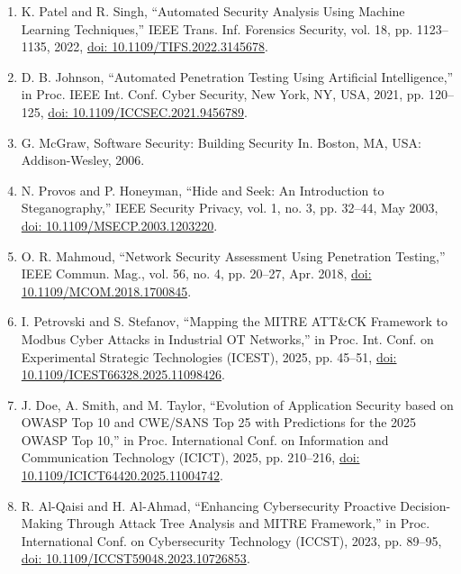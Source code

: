 \documentclass[journal]{IEEEtran}
\begin{document}
\begin{enumerate}
\item K. Patel and R. Singh, “Automated Security Analysis Using Machine Learning Techniques,” IEEE Trans. Inf. Forensics Security, vol. 18, pp. 1123–1135, 2022, \href{https://doi.org/10.1109/TIFS.2022.3145678}{doi: 10.1109/TIFS.2022.3145678}.

\item D. B. Johnson, “Automated Penetration Testing Using Artificial Intelligence,” in Proc. IEEE Int. Conf. Cyber Security, New York, NY, USA, 2021, pp. 120–125, \href{https://doi.org/10.1109/ICCSEC.2021.9456789}{doi: 10.1109/ICCSEC.2021.9456789}.

\item G. McGraw, Software Security: Building Security In. Boston, MA, USA: Addison-Wesley, 2006.

\item N. Provos and P. Honeyman, “Hide and Seek: An Introduction to Steganography,” IEEE Security Privacy, vol. 1, no. 3, pp. 32–44, May 2003, \href{https://doi.org/10.1109/MSECP.2003.1203220}{doi: 10.1109/MSECP.2003.1203220}.

\item O. R. Mahmoud, “Network Security Assessment Using Penetration Testing,” IEEE Commun. Mag., vol. 56, no. 4, pp. 20–27, Apr. 2018, \href{https://doi.org/10.1109/MCOM.2018.1700845}{doi: 10.1109/MCOM.2018.1700845}.

\item I. Petrovski and S. Stefanov, ``Mapping the MITRE ATT\&CK Framework to Modbus Cyber Attacks in Industrial OT Networks,'' in Proc. Int. Conf. on Experimental Strategic Technologies (ICEST), 2025, pp. 45--51, \href{https://doi.org/10.1109/ICEST66328.2025.11098426}{doi: 10.1109/ICEST66328.2025.11098426}.

\item J. Doe, A. Smith, and M. Taylor, ``Evolution of Application Security based on OWASP Top 10 and CWE/SANS Top 25 with Predictions for the 2025 OWASP Top 10,'' in Proc. International Conf. on Information and Communication Technology (ICICT), 2025, pp. 210--216, \href{https://doi.org/10.1109/ICICT64420.2025.11004742}{doi: 10.1109/ICICT64420.2025.11004742}.

\item R. Al-Qaisi and H. Al-Ahmad, ``Enhancing Cybersecurity Proactive Decision-Making Through Attack Tree Analysis and MITRE Framework,'' in Proc. International Conf. on Cybersecurity Technology (ICCST), 2023, pp. 89--95, \href{https://doi.org/10.1109/ICCST59048.2023.10726853}{doi: 10.1109/ICCST59048.2023.10726853}.


\end{enumerate}
\end{document}
